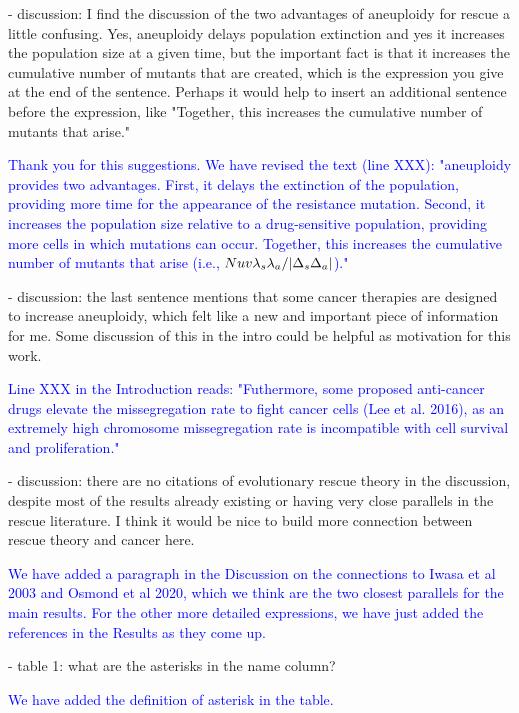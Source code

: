 \documentclass[12pt]{extarticle}
\begin{document}
- discussion: I find the discussion of the two advantages of aneuploidy for rescue a little confusing. Yes, aneuploidy delays population extinction and yes it increases the population size at a given time, but the important fact is that it increases the cumulative number of mutants that are created, which is the expression you give at the end of the sentence. Perhaps it would help to insert an additional sentence before the expression, like "Together, this increases the cumulative number of mutants that arise."

\textcolor{blue}{%
Thank you for this suggestions. We have revised the text (line XXX): "aneuploidy provides two advantages. First, it delays the extinction of the population, providing more time for the appearance of the resistance mutation. Second, it increases the population size relative to a drug-sensitive population, providing more cells in which mutations can occur. Together, this increases the cumulative number of mutants that arise (i.e., $Nuv\lambda_s\lambda_a/\abs{\Delta_s\Delta_a}$)."
} 

- discussion: the last sentence mentions that some cancer therapies are designed to increase aneuploidy, which felt like a new and important piece of information for me. Some discussion of this in the intro could be helpful as motivation for this work.

\textcolor{blue}{%
Line XXX in the Introduction reads: "Futhermore, some proposed anti-cancer drugs elevate the missegregation rate to fight cancer cells (Lee et al. 2016), as an extremely high chromosome missegregation rate is incompatible with cell survival and proliferation."
} 

- discussion: there are no citations of evolutionary rescue theory in the discussion, despite most of the results already existing or having very close parallels in the rescue literature. I think it would be nice to build more connection between rescue theory and cancer here.

\textcolor{blue}{We have added a paragraph in the Discussion on the connections to Iwasa et al 2003 and Osmond et al 2020, which we think are the two closest parallels for the main results. 
For the other more detailed expressions, we have just added the references in the Results as they come up.} 

- table 1: what are the asterisks in the name column?

\textcolor{blue}{%
We have added the definition of asterisk in the table.
} 
\end{document}
